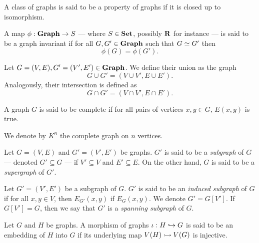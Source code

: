\begin{definition}\label{def: graph-property}
A class of graphs is said to be a property of graphs if it is closed up to
isomorphism.
\end{definition}

\begin{definition}\label{def: graph-invariant}
A map \(\phi: {\textbf{Graph}} \to S\) --- where \(S \in {\textbf{Set}}\), possibly \(\mathbf{R}\) for
instance --- is said to be a graph invariant if for all \(G, G' \in
{\textbf{Graph}}\) such that \(G \simeq G'\) then
\[
  \phi(G) = \phi(G').
\]
\end{definition}

\begin{definition}\label{def: union-intersection-gph}
Let \(G = (V, E), G' = (V', E') \in {\textbf{Graph}}\). We define their union as the
graph
\[
  G \cup G' = (V \cup V', E \cup E').
\]
Analogously, their intersection is defined as
\[
  G \cap G' = (V \cap V', E \cap E').
\]
\end{definition}

\begin{definition}\label{def: complete-graph}
A graph \(G\) is said to be complete if for all pairs of vertices \(x, y \in
G\), \(E(x, y)\) is true.
\end{definition}

\begin{notation}
We denote by \(K^n\) the complete graph on \(n\) vertices.
\end{notation}

\begin{definition}[Subgraph]
Let \(G = (V, E)\) and \(G' = (V', E')\) be graphs. \(G'\) is said to be a
\emph{subgraph} of \(G\) --- denoted \(G' \subseteq G\) --- if \(V' \subseteq
V\) and \(E' \subseteq E\). On the other hand, \(G\) is said to be a
\emph{supergraph} of \(G'\).
\end{definition}

\begin{definition}
Let \(G' = (V', E')\) be a subgraph of \(G\). \(G'\) is said to be an
\emph{induced subgraph} of \(G\) if for all \(x, y \in V\), then \(E_{G'}(x,
y)\) if \(E_G(x, y)\). We denote \(G' = G[V']\). If \(G[V'] = G\), then we say
that \(G'\) is a \emph{spanning subgraph} of \(G\).
\end{definition}

\begin{definition}\label{def: graph-embedding}
Let \(G\) and \(H\) be graphs. A morphism of graphs \(\iota: H \hookrightarrow G\) is
said to be an embedding of \(H\) into \(G\) if its underlying map \(V(H) \rightarrowtail
V(G)\) is injective.
\end{definition}

